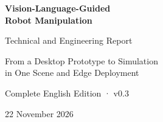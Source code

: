 

\hypersetup{pageanchor=false}
\begin{titlepage}
\centering\vspace*{28mm}
{\Huge\bfseries Vision-Language-Guided\\[4mm]Robot Manipulation\par}
\vspace{12mm}
{\Large Technical and Engineering Report\par}
\vspace{15mm}
{\large From a Desktop Prototype to Simulation\\[3mm]in One Scene and Edge Deployment\par}
\vfill
{\large Complete English Edition · v0.3\par}
\vspace{5mm}
{\large 22 November 2026\par}
\vspace*{22mm}
\end{titlepage}
\frontmatter
\hypersetup{pageanchor=true}

\tableofcontents
\listoffigures
\listoftables
\mainmatter









\appendix




\backmatter


